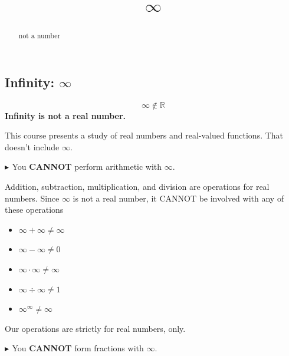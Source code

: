 \documentclass{ximera}
\title{$\infty$}
\begin{document}
\begin{abstract}
not a number
\end{abstract}
\maketitle




\subsection*{Infinity: $\infty$}


\begin{center}

\[ \infty \notin \mathbb{R} \]
\textbf{\textcolor{red!70!black}{Infinity is not a real number.}}

\end{center}




This course presents a study of real numbers and real-valued functions. That doesn't include $\infty$.




\textbf{\textcolor{red!70!darkgray}{$\blacktriangleright$ }} You \textbf{\textcolor{red!70!black}{CANNOT}} perform arithmetic with $\infty$.

Addition, subtraction, multiplication, and division are operations for real numbers.  Since $\infty$ is not a real number, it CANNOT be involved with any of these operations


\begin{example}


\begin{itemize}
\item $\infty + \infty \ne \infty$
\item $\infty - \infty \ne 0$
\item $\infty \cdot \infty \ne \infty$
\item $\infty \div \infty \ne 1$
\item $\infty^{\infty} \ne \infty$
\end{itemize}


\end{example}

Our operations are strictly for real numbers, only.









\textbf{\textcolor{red!70!darkgray}{$\blacktriangleright$ }} You \textbf{\textcolor{red!70!black}{CANNOT}} form fractions with $\infty$.
\end{document}

